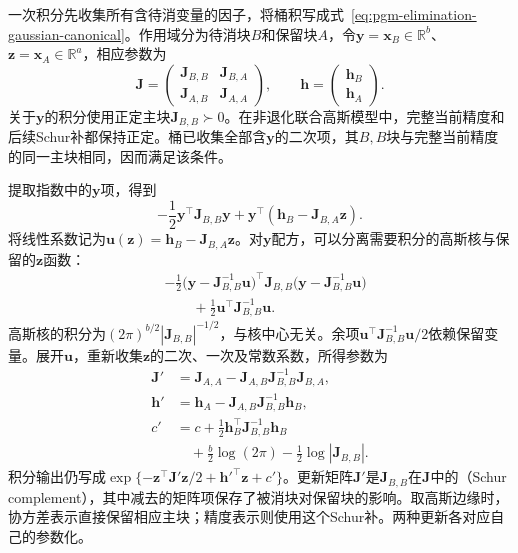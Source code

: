 一次积分先收集所有含待消变量的因子，将桶积写成式~\eqref{eq:pgm-elimination-gaussian-canonical}。作用域分为待消块$B$和保留块$A$，令$\bm{y}=\bm{x}_B\in\mathbb{R}^{b}$、$\bm{z}=\bm{x}_A\in\mathbb{R}^{a}$，相应参数为
\[
  \bm{J}=
  \begin{pmatrix}
    \bm{J}_{B,B}&\bm{J}_{B,A}\\
    \bm{J}_{A,B}&\bm{J}_{A,A}
  \end{pmatrix},
  \qquad
  \bm{h}=
  \begin{pmatrix}\bm{h}_B\\\bm{h}_A\end{pmatrix}.
\]
关于$\bm{y}$的积分使用正定主块$\bm{J}_{B,B}\succ0$。在非退化联合高斯模型中，完整当前精度和后续Schur补都保持正定。桶已收集全部含$\bm{y}$的二次项，其$B,B$块与完整当前精度的同一主块相同，因而满足该条件。

提取指数中的$\bm{y}$项，得到
\[
  -\frac12\bm{y}^{\top}\bm{J}_{B,B}\bm{y}
  +\bm{y}^{\top}(\bm{h}_B-\bm{J}_{B,A}\bm{z}).
\]
将线性系数记为$\bm{u}(\bm{z})=\bm{h}_B-\bm{J}_{B,A}\bm{z}$。对$\bm{y}$配方，可以分离需要积分的高斯核与保留的$\bm{z}$函数：
\begin{equation}
  \begin{aligned}
    &-\frac12
      \bigl(\bm{y}-\bm{J}_{B,B}^{-1}\bm{u}\bigr)^{\top}
      \bm{J}_{B,B}
      \bigl(\bm{y}-\bm{J}_{B,B}^{-1}\bm{u}\bigr)\\
    &\hspace{2em}
      +\frac12\bm{u}^{\top}\bm{J}_{B,B}^{-1}\bm{u}.
  \end{aligned}
  \label{eq:pgm-elimination-complete-square}
\end{equation}
高斯核的积分为$(2\pi)^{b/2}|\bm{J}_{B,B}|^{-1/2}$，与核中心无关。余项$\bm{u}^{\top}\bm{J}_{B,B}^{-1}\bm{u}/2$依赖保留变量。展开$\bm{u}$，重新收集$\bm{z}$的二次、一次及常数系数，所得参数为
\begin{equation}
  \begin{aligned}
    \bm{J}'&=\bm{J}_{A,A}
      -\bm{J}_{A,B}\bm{J}_{B,B}^{-1}\bm{J}_{B,A},\\
    \bm{h}'&=\bm{h}_A
      -\bm{J}_{A,B}\bm{J}_{B,B}^{-1}\bm{h}_B,\\
    c'&=c+\frac12\bm{h}_B^{\top}\bm{J}_{B,B}^{-1}\bm{h}_B\\
      &\quad+\frac b2\log(2\pi)-\frac12\log|\bm{J}_{B,B}|.
  \end{aligned}
  \label{eq:pgm-elimination-schur}
\end{equation}
积分输出仍写成$\exp\{-\bm{z}^{\top}\bm{J}'\bm{z}/2+\bm{h}'^{\top}\bm{z}+c'\}$。更新矩阵$\bm{J}'$是$\bm{J}_{B,B}$在$\bm{J}$中的（Schur complement），其中减去的矩阵项保存了被消块对保留块的影响。取高斯边缘时，协方差表示直接保留相应主块；精度表示则使用这个Schur补。两种更新各对应自己的参数化。

